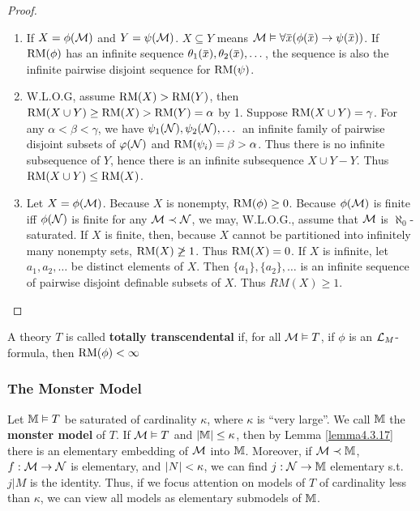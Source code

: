 \documentclass[11pt]{article}
\begin{document}
\begin{proof}
\begin{enumerate}
\item If \(X=\phi(\mathcal{M})\) and \(Y=\psi(\mathcal{M})\). \(X\subseteq Y\) means \(\calm\vDash\forall \barx(\phi(\barx)\to\psi(\barx))\). If \(\operatorname{RM}(\phi)\) has an
 infinite sequence \(\theta_1(\barx),\theta_2(\barx),\dots\), the sequence is also the infinite pairwise
disjoint sequence for \(\operatorname{RM}(\psi)\).
\item W.L.O.G, assume \(\operatorname{RM}(X)>\operatorname{RM}(Y)\), then \(\operatorname{RM}(X\cup Y)\ge\operatorname{RM}(X)>\operatorname{RM}(Y)=\alpha\) by 1.
Suppose \(\operatorname{RM}(X\cup Y)=\gamma\). For any \(\alpha<\beta<\gamma\), we have \(\psi_1(\mathcal{N}),\psi_2(\mathcal{N}),\dots\) an infinite family of
pairwise disjoint subsets of \(\varphi(\mathcal{N})\) and \(\operatorname{RM}(\psi_i)=\beta>\alpha\). Thus there is no infinite
subsequence of \(Y\), hence there is an infinite subsequence \(X\cup Y-Y\). Thus \(\operatorname{RM}(X\cup Y)\le \operatorname{RM}(X)\).
\item Let \(X=\phi(\mathcal{M})\). Because \(X\) is nonempty, \(\operatorname{RM}(\phi)\ge 0\). Because \(\phi(\mathcal{M})\) is finite
iff \(\phi(\mathcal{N})\) is finite for any \(\mathcal{M}\prec\mathcal{N}\), we may, W.L.O.G., assume that \(\mathcal{M}\)
is \(\aleph_0\)-saturated. If \(X\) is finite, then, because \(X\) cannot be partitioned into
infinitely many nonempty sets, \(\operatorname{RM}(X)\not\ge 1\). Thus \(\operatorname{RM}(X)=0\). If \(X\) is infinite,
let \(a_1,a_2,\dots\) be distinct elements of \(X\). Then
\(\{a_1\},\{a_2\},\dots\) is an infinite sequence of pairwise disjoint definable subsets of \(X\).
Thus \(RM(X)\ge 1\).
\end{enumerate}
\end{proof}

\begin{definition}[]
A theory \(T\) is called \textbf{totally transcendental} if, for all \(\mathcal{M}\vDash T\), if \(\phi\) is
an \(\mathcal{L}_M\)-formula, then \(\operatorname{RM}(\phi)<\infty\)
\end{definition}
\subsubsection{The Monster Model}
\label{sec:org2d67678}
Let \(\mathbb{M}\vDash T\) be saturated of cardinality \(\kappa\), where \(\kappa\) is ``very large''. We call \(\mathbb{M}\) the \textbf{monster
model} of \(T\). If \(\mathcal{M}\vDash T\) and \(\abs{\M}\le\kappa\), then by Lemma \ref{lemma4.3.17} there is an
elementary embedding of \(\mathcal{M}\) into \(\mathbb{M}\). Moreover, if \(\mathcal{M}\prec\mathbb{M}\), \(f:\mathcal{M}\to\mathcal{N}\) is elementary,
and \(\abs{N}<\kappa\), we can find \(j:\mathcal{N}\to\mathbb{M}\) elementary s.t. \(j|M\) is the identity. Thus, if we
focus attention on models of \(T\) of cardinality less than \(\kappa\), we can view all models as
elementary submodels of \(\mathbb{M}\).
\end{document}

